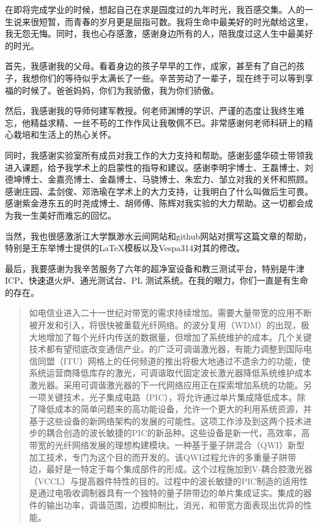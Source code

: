 \documentclass{ZJUthesis}
\begin{document}
\begin{thanks}
在即将完成学业的时候，想起自己在求是园度过的九年时光，我百感交集。人的一生说来很短暂，而青春的岁月更是屈指可数。我将生命中最美好的时光献给这里，我无怨无悔。同时，我也心存感激，感谢身边所有的人，陪我度过这人生中最美好的时光。

首先，我感谢我的父母。看着身边的孩子早早的工作，成家，甚至有了自己的孩子，我想你们的等待似乎太满长了一些。辛苦劳动了一辈子，现在终于可以等到享福的时候了。爸爸妈妈，你们为我骄傲，我为你们骄傲。

然后，我感谢我的导师何建军教授。何老师渊博的学识、严谨的态度让我终生难忘，他精益求精、一丝不苟的工作作风让我敬佩不已。非常感谢何老师科研上的精心栽培和生活上的热心关怀。

同时，我感谢实验室所有成员对我工作的大力支持和帮助。感谢彭盛华硕士带领我进入课题，给予我学术上的启蒙性的指导和建议。感谢李明宇博士、王磊博士、刘德坤博士、金嘉亮博士、金磊博士、马骁博士、朱宏力、邹立对我的关怀和照顾。感谢庄园、孟剑俊、邓浩瑜在学术上的大力支持，让我明白了什么叫做后生可畏。感谢紫金港东五的时尧成博士、胡师傅、陈辉对我实验的大力帮助。这一切都会成为我一生美好而难忘的回忆。

当然，我也很感激浙江大学飘渺水云间网站和github网站对撰写这篇文章的帮助，特别是王东举博士提供的LaTeX模板以及Vespa314对其的修改。

最后，我要感谢为我辛苦服务了六年的超净室设备和教三测试平台，特别是牛津ICP、快速退火炉、通光测试台、PL 测试系统。在我的眼力，你们一直是有生命的存在。
\end{thanks}

\begin{abstract}
如电信业进入二十一世纪对带宽的需求持续增加。需要大量带宽的应用不断被开发和引入，将很快被重载光纤网络。的波分复用（WDM）的出现，极大地增加了每个光纤内传送的数据量，但增加了系统维护的成本。几个关键技术都有望彻底改变通信产业。的广泛可调谐激光器，有能力调整到国际电信同盟（ITU）网格上的任何频道的推出将极大地通过不遗余力的功能，使系统运营商降低库存的激光，可调谐取代固定波长激光器降低系统维护成本激光器。采用可调谐激光器的下一代网络应用正在探索增加系统的功能。另一项关键技术，光子集成电路（PIC），将允许通过单片集成降低成本。除了降低成本的简单问题来的高功能设备，允许一个更大的利用系统资源，并基于这些设备的新网络架构的发展的可能性。这项工作涉及到这两个技术进步的耦合创造的波长敏捷的PIC的新品种。这些设备是新一代，高效率，高带宽的光纤网络发展的理想构建模块。一种基于量子阱混合（QWI）新型加工技术，专门为这个目的而开发的。该QWI过程允许的多重量子阱带边，最好是一特定于每个集成部件的形成。这个过程施加到V-耦合腔激光器（VCCL）与提高器件特性的目的。过程中的波长敏捷的PIC制造的适用性是通过电吸收调制器具有一个独特的量子阱带边的单片集成证实。集成的器件的输出功率，调谐范围，边模抑制比，消光，和带宽方面表现出优异的性能。

\end{abstract}
\end{document}
